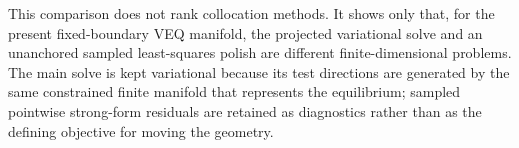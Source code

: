 \documentclass[final, 3p, times]{elsarticle}
\begin{document}
This comparison does not rank collocation methods. It shows only that, for the present fixed-boundary VEQ manifold, the projected variational solve and an unanchored sampled least-squares polish are different finite-dimensional problems. The main solve is kept variational because its test directions are generated by the same constrained finite manifold that represents the equilibrium; sampled pointwise strong-form residuals are retained as diagnostics rather than as the defining objective for moving the geometry.



\end{document}
